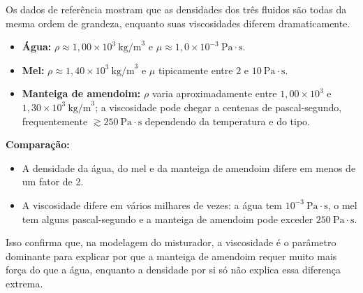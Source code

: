 Os dados de referência mostram que as densidades dos três fluidos são todas da mesma ordem de grandeza, enquanto suas viscosidades diferem dramaticamente.

\begin{itemize}
    \item \textbf{Água:} $\rho\approx1{,}00\times10^{3}\ \text{kg/m}^{3}$ e $\mu\approx1{,}0\times10^{-3}\ \text{Pa}\cdot\text{s}$.
    \item \textbf{Mel:} $\rho\approx1{,}40\times10^{3}\ \text{kg/m}^{3}$ e $\mu$ tipicamente entre $2$ e $10\ \text{Pa}\cdot\text{s}$.
    \item \textbf{Manteiga de amendoim:} $\rho$ varia aproximadamente entre $1{,}00\times10^{3}$ e $1{,}30\times10^{3}\ \text{kg/m}^{3}$; a viscosidade pode chegar a centenas de pascal-segundo, frequentemente $\gtrsim250\ \text{Pa}\cdot\text{s}$ dependendo da temperatura e do tipo.
\end{itemize}

\textbf{Comparação:}
\begin{itemize}
    \item A densidade da água, do mel e da manteiga de amendoim difere em menos de um fator de 2.
    \item A viscosidade difere em vários milhares de vezes: a água tem $10^{-3}\ \text{Pa}\cdot\text{s}$, o mel tem alguns pascal-segundo e a manteiga de amendoim pode exceder $250\ \text{Pa}\cdot\text{s}$.
\end{itemize}

Isso confirma que, na modelagem do misturador, a viscosidade é o parâmetro dominante para explicar por que a manteiga de amendoim requer muito mais força do que a água, enquanto a densidade por si só não explica essa diferença extrema.
